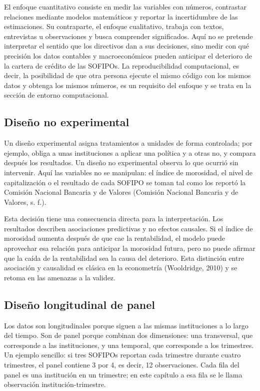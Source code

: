 El enfoque cuantitativo consiste en medir las variables con números, contrastar relaciones mediante modelos matemáticos y reportar la incertidumbre de las estimaciones. Su contraparte, el enfoque cualitativo, trabaja con textos, entrevistas u observaciones y busca comprender significados. Aquí no se pretende interpretar el sentido que los directivos dan a sus decisiones, sino medir con qué precisión los datos contables y macroeconómicos pueden anticipar el deterioro de la cartera de crédito de las SOFIPOs. La reproducibilidad computacional, es decir, la posibilidad de que otra persona ejecute el mismo código con los mismos datos y obtenga los mismos números, es un requisito del enfoque y se trata en la sección de entorno computacional.

\subsection{Diseño no experimental}
Un diseño experimental asigna tratamientos a unidades de forma controlada; por ejemplo, obliga a unas instituciones a aplicar una política y a otras no, y compara después los resultados. Un diseño no experimental observa lo que ocurrió sin intervenir. Aquí las variables no se manipulan: el índice de morosidad, el nivel de capitalización o el resultado de cada SOFIPO se toman tal como los reportó la Comisión Nacional Bancaria y de Valores (Comisión Nacional Bancaria y de Valores, s. f.).

Esta decisión tiene una consecuencia directa para la interpretación. Los resultados describen asociaciones predictivas y no efectos causales. Si el índice de morosidad aumenta después de que cae la rentabilidad, el modelo puede aprovechar esa relación para anticipar la morosidad futura, pero no puede afirmar que la caída de la rentabilidad sea la causa del deterioro. Esta distinción entre asociación y causalidad es clásica en la econometría (Wooldridge, 2010) y se retoma en las amenazas a la validez.

\subsection{Diseño longitudinal de panel}
Los datos son longitudinales porque siguen a las mismas instituciones a lo largo del tiempo. Son de panel porque combinan dos dimensiones: una transversal, que corresponde a las instituciones, y una temporal, que corresponde a los trimestres. Un ejemplo sencillo: si tres SOFIPOs reportan cada trimestre durante cuatro trimestres, el panel contiene 3 por 4, es decir, 12 observaciones. Cada fila del panel es una institución en un trimestre; en este capítulo a esa fila se le llama observación institución-trimestre.

